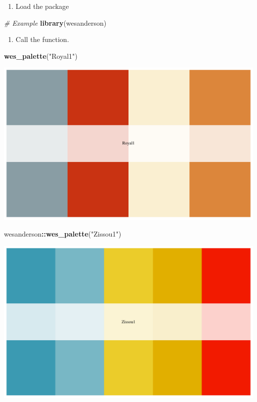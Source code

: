 \documentclass[
]{book}
\newenvironment{Shaded}{\begin{snugshade}}{\end{snugshade}}
\newcommand{\CommentTok}[1]{\textcolor[rgb]{0.56,0.35,0.01}{\textit{#1}}}
\newcommand{\KeywordTok}[1]{\textcolor[rgb]{0.13,0.29,0.53}{\textbf{#1}}}
\newcommand{\NormalTok}[1]{#1}
\newcommand{\OperatorTok}[1]{\textcolor[rgb]{0.81,0.36,0.00}{\textbf{#1}}}
\newcommand{\StringTok}[1]{\textcolor[rgb]{0.31,0.60,0.02}{#1}}
\providecommand{\tightlist}{%
  \setlength{\itemsep}{0pt}\setlength{\parskip}{0pt}}
\begin{document}
\begin{enumerate}
\def\labelenumi{\arabic{enumi}.}
\setcounter{enumi}{1}
\tightlist
\item
  Load the package
\end{enumerate}

\begin{Shaded}
\begin{Highlighting}[]
\CommentTok{# Example}
\KeywordTok{library}\NormalTok{(wesanderson)}
\end{Highlighting}
\end{Shaded}

\begin{enumerate}
\def\labelenumi{\arabic{enumi}.}
\setcounter{enumi}{2}
\tightlist
\item
  Call the function.
\end{enumerate}

\begin{Shaded}
\begin{Highlighting}[]
\KeywordTok{wes_palette}\NormalTok{(}\StringTok{"Royal1"}\NormalTok{)}
\end{Highlighting}
\end{Shaded}

\includegraphics{figures/unnamed-chunk-136-1.pdf}

\begin{Shaded}
\begin{Highlighting}[]
\NormalTok{wesanderson}\OperatorTok{::}\KeywordTok{wes_palette}\NormalTok{(}\StringTok{"Zissou1"}\NormalTok{)}
\end{Highlighting}
\end{Shaded}

\includegraphics{figures/unnamed-chunk-136-2.pdf}
\end{document}
